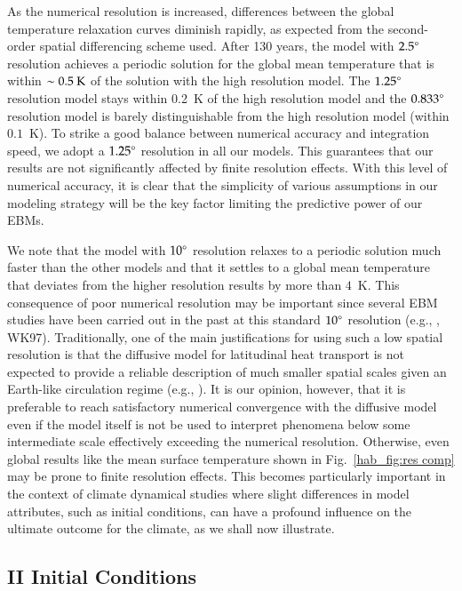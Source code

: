 As the numerical resolution is increased, differences between the
global temperature relaxation curves diminish rapidly, as expected
from the second-order spatial differencing scheme used. After 130
years, the model with $2.5\mbox{$^\circ$}$ resolution achieves a periodic
solution for the global mean temperature that is within $\sim 0.5
{\rm~K}$ of the solution with the high resolution model. The
$1.25\mbox{$^\circ$}$ resolution model stays within 0.2~K of the high resolution
model and the $0.833\mbox{$^\circ$}$ resolution model is barely distinguishable
from the high resolution model (within $0.1$~K).  To strike a good
balance between numerical accuracy and integration speed, we adopt a
$1.25\mbox{$^\circ$}$ resolution in all our models. This guarantees that our
results are not significantly affected by finite resolution
effects. With this level of numerical accuracy, it is clear that the
simplicity of various assumptions in our modeling strategy will be the
key factor limiting the predictive power of our EBMs.

We note that the model with $10\mbox{$^\circ$}$ resolution relaxes to a periodic
solution much faster than the other models and that it settles to a
global mean temperature that deviates from the higher resolution
results by more than $4$~K. This consequence of poor numerical
resolution may be important since several EBM studies have been
carried out in the past at this standard $10\mbox{$^\circ$}$ resolution (e.g.,
\citet{sellers1969}, WK97). Traditionally, one of the main
justifications for using such a low spatial resolution is that the
diffusive model for latitudinal heat transport is not expected to
provide a reliable description of much smaller spatial scales given an
Earth-like circulation regime (e.g.,
\citet{lorenz1979,north+coakley1979}).  It is our opinion, however,
that it is preferable to reach satisfactory numerical convergence with
the diffusive model even if the model itself is not be used to
interpret phenomena below some intermediate scale effectively
exceeding the numerical resolution.  Otherwise, even global results
like the mean surface temperature shown in Fig.~\ref{hab_fig:res comp}
may be prone to finite resolution effects. This becomes particularly
important in the context of climate dynamical studies where slight
differences in model attributes, such as initial conditions, can have
a profound influence on the ultimate outcome for the climate, as we
shall now illustrate.


\subsection*{II Initial Conditions}
\label{hab_sec:init}


